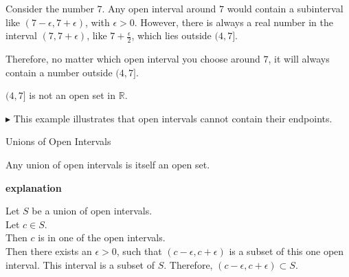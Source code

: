 \documentclass{ximera}
\begin{document}
\begin{example}
\begin{image}
  \end{image}








Consider the number $7$.  Any open interval around $7$ would contain a subinterval like $(7 - \epsilon, 7 + \epsilon)$, with  $\epsilon > 0$.  However, there is always a real number in the interval $(7, 7 + \epsilon)$, like $7 + \frac{\epsilon}{2}$, which lies outside $(4, 7]$.

Therefore, no matter which open interval you choose around $7$, it will always contain a number outside $(4, 7]$.

$(4, 7]$  is not an open set in $\mathbb{R}$.


\end{example}

$\blacktriangleright$ This example illustrates that open intervals cannot contain their endpoints. 





\begin{example}  Unions of Open Intervals 


Any union of open intervals is itself an open set.


\textbf{\textcolor{red!75!green}{explanation}} 


Let $S$ be a union of open intervals.  \\
Let $c \in S$. \\
Then $c$ is in one of the open intervals. \\
Then there exists an $\epsilon > 0$, such that $(c - \epsilon, c + \epsilon)$ is a subset of this one open interval.  This interval is a subset of $S$.  Therefore, $(c - \epsilon, c + \epsilon) \subset S$. 




\end{example}
\end{document}
